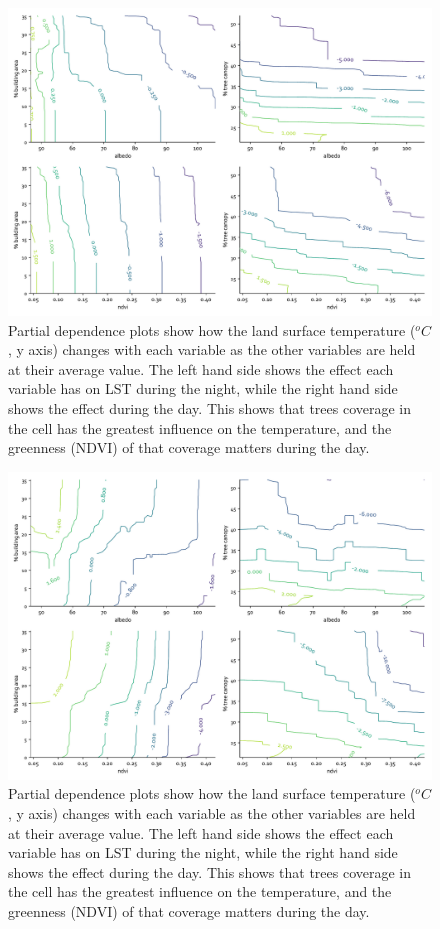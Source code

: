 \documentclass[final,3p,times,twocolumn,sort&compress]{elsarticle}
\begin{document}
\begin{figure}
    \centering
    \includegraphics[width=\linewidth]{fig/report/pdp_2d_night_100.pdf}
    \caption{
    Partial dependence plots show how the land surface temperature ($^oC$, y axis) changes with each variable as the other variables are held at their average value. The left hand side shows the effect each variable has on LST during the night, while the right hand side shows the effect during the day. This shows that trees coverage in the cell has the greatest influence on the temperature, and the greenness (NDVI) of that coverage matters during the day.
    }
    \label{fig:pdp_2dnight}
\end{figure}

\begin{figure}
    \centering
    \includegraphics[width=\linewidth]{fig/report/pdp_2d_day_100.pdf}
    \caption{
    Partial dependence plots show how the land surface temperature ($^oC$, y axis) changes with each variable as the other variables are held at their average value. The left hand side shows the effect each variable has on LST during the night, while the right hand side shows the effect during the day. This shows that trees coverage in the cell has the greatest influence on the temperature, and the greenness (NDVI) of that coverage matters during the day.
    }
    \label{fig:pdp_2dday}
\end{figure}
\end{document}
